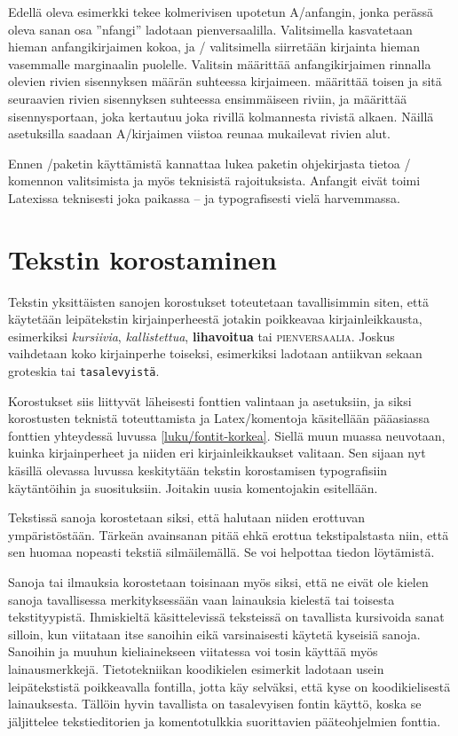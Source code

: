 Edellä oleva esimerkki tekee kolmerivisen upotetun A\-/anfangin, jonka
perässä oleva sanan osa ''nfangi'' ladotaan pienversaalilla.
Valitsimella  kasvatetaan hieman anfangikirjaimen
kokoa, ja \-/ valitsimella siirretään kirjainta hieman
vasemmalle marginaalin puolelle. Valitsin  määrittää
anfangikirjaimen rinnalla olevien rivien sisennyksen määrän suhteessa
kirjaimeen.  määrittää toisen ja sitä seuraavien rivien
sisennyksen suhteessa ensimmäiseen riviin, ja  määrittää
sisennysportaan, joka kertautuu joka rivillä kolmannesta rivistä alkaen.
Näillä asetuksilla saadaan A\-/kirjaimen viistoa reunaa mukailevat
rivien alut.

Ennen \-/paketin käyttämistä kannattaa lukea paketin
ohjekirjasta tietoa \-/ komennon valitsimista ja myös
teknisistä rajoituksista. Anfangit eivät toimi Latexissa teknisesti joka
paikassa -- ja typografisesti vielä harvemmassa.

\section{Tekstin korostaminen}
\label{luku/korostus}

Tekstin yksittäisten sanojen korostukset toteutetaan tavallisimmin
siten, että käytetään leipätekstin kirjainperheestä jotakin poikkeavaa
kirjainleikkausta, esimerkiksi \textit{kursiivia},
\textsl{kallistettua}, \textbf{lihavoitua} tai \textsc{pienversaalia}.
Joskus vaihdetaan koko kirjainperhe toiseksi, esimerkiksi ladotaan
\textrm{antiikvan} sekaan \textsf{groteskia} tai \texttt{tasalevyistä}.

Korostukset siis liittyvät läheisesti fonttien valintaan ja asetuksiin,
ja siksi korostusten teknistä toteuttamista ja Latex\-/komentoja
käsitellään pääasiassa fonttien yhteydessä luvussa
\ref{luku/fontit-korkea}. Siellä muun muassa neuvotaan, kuinka
kirjainperheet ja niiden eri kirjainleikkaukset valitaan. Sen sijaan nyt
käsillä olevassa luvussa keskitytään tekstin korostamisen typografisiin
käytäntöihin ja suosituksiin. Joitakin uusia komentojakin esitellään.

Tekstissä sanoja korostetaan siksi, että halutaan niiden erottuvan
ympäristöstään. Tärkeän avainsanan pitää ehkä erottua tekstipalstasta
niin, että sen huomaa nopeasti tekstiä silmäilemällä. Se voi helpottaa
tiedon löytämistä.

Sanoja tai ilmauksia korostetaan toisinaan myös siksi, että ne eivät ole
kielen sanoja tavallisessa merkityksessään vaan lainauksia kielestä tai
toisesta tekstityypistä. Ihmiskieltä käsittelevissä teksteissä on
tavallista kursivoida sanat silloin, kun viitataan itse sanoihin eikä
varsinaisesti käytetä kyseisiä sanoja. Sanoihin ja muuhun kieliainekseen
viitatessa voi tosin käyttää myös lainausmerkkejä. Tietotekniikan
koodikielen esimerkit ladotaan usein leipätekstistä poikkeavalla
fontilla, jotta käy selväksi, että kyse on koodikielisestä lainauksesta.
Tällöin hyvin tavallista on tasalevyisen fontin käyttö, koska se
jäljittelee tekstieditorien ja komentotulkkia suorittavien
pääteohjelmien fonttia.

